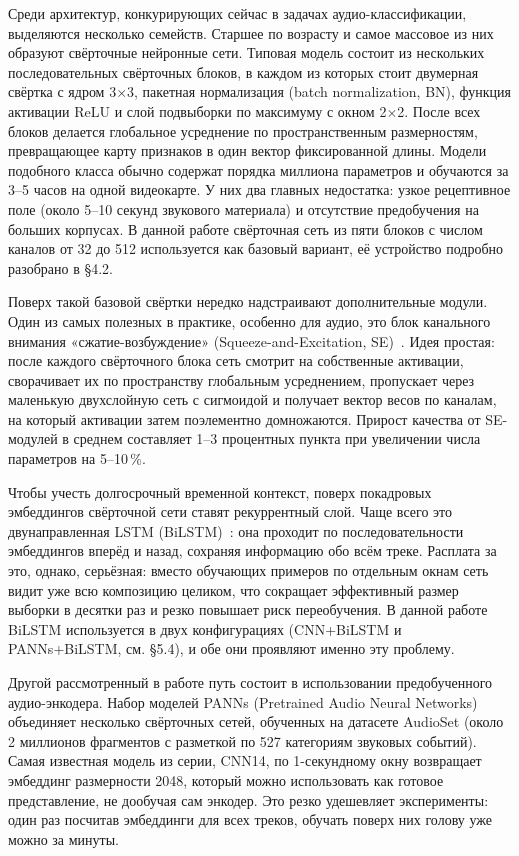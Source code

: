 Среди архитектур, конкурирующих сейчас в задачах аудио-классификации, выделяются несколько семейств. Старшее по возрасту и самое массовое из них образуют свёрточные нейронные сети. Типовая модель состоит из нескольких последовательных свёрточных блоков, в каждом из которых стоит двумерная свёртка с ядром 3$\times$3, пакетная нормализация (batch normalization, BN), функция активации ReLU и слой подвыборки по максимуму с окном 2$\times$2. После всех блоков делается глобальное усреднение по пространственным размерностям, превращающее карту признаков в один вектор фиксированной длины. Модели подобного класса обычно содержат порядка миллиона параметров и обучаются за 3--5 часов на одной видеокарте. У них два главных недостатка: узкое рецептивное поле (около 5--10 секунд звукового материала) и отсутствие предобучения на больших корпусах. В данной работе свёрточная сеть из пяти блоков с числом каналов от 32 до 512 используется как базовый вариант, её устройство подробно разобрано в §4.2.

Поверх такой базовой свёртки нередко надстраивают дополнительные модули. Один из самых полезных в практике, особенно для аудио, это блок канального внимания «сжатие-возбуждение» (Squeeze-and-Excitation, SE)~\cite{hu2018se}. Идея простая: после каждого свёрточного блока сеть смотрит на собственные активации, сворачивает их по пространству глобальным усреднением, пропускает через маленькую двухслойную сеть с сигмоидой и получает вектор весов по каналам, на который активации затем поэлементно домножаются. Прирост качества от SE-модулей в среднем составляет 1--3 процентных пункта при увеличении числа параметров на 5--10\,\%.

Чтобы учесть долгосрочный временной контекст, поверх покадровых эмбеддингов свёрточной сети ставят рекуррентный слой. Чаще всего это двунаправленная LSTM (BiLSTM)~\cite{hochreiter1997lstm}: она проходит по последовательности эмбеддингов вперёд и назад, сохраняя информацию обо всём треке. Расплата за это, однако, серьёзная: вместо обучающих примеров по отдельным окнам сеть видит уже всю композицию целиком, что сокращает эффективный размер выборки в десятки раз и резко повышает риск переобучения. В данной работе BiLSTM используется в двух конфигурациях (CNN+BiLSTM и PANNs+BiLSTM, см. §5.4), и обе они проявляют именно эту проблему.

Другой рассмотренный в работе путь состоит в использовании предобученного аудио-энкодера. Набор моделей PANNs (Pretrained Audio Neural Networks)~\cite{kong2020panns} объединяет несколько свёрточных сетей, обученных на датасете AudioSet (около 2 миллионов фрагментов с разметкой по 527 категориям звуковых событий). Самая известная модель из серии, CNN14, по 1-секундному окну возвращает эмбеддинг размерности 2048, который можно использовать как готовое представление, не дообучая сам энкодер. Это резко удешевляет эксперименты: один раз посчитав эмбеддинги для всех треков, обучать поверх них голову уже можно за минуты.

